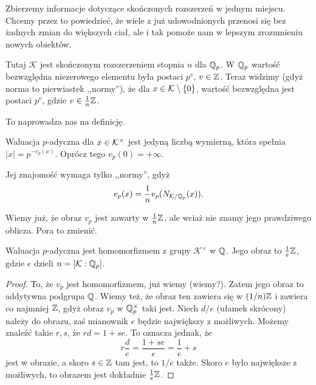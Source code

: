 Zbierzemy informacje dotyczące skończonych rozszerzeń w jednym miejscu.
Chcemy przez to powiedzieć, że wiele z już udowodnionych przenosi się bez żadnych zmian do większych ciał, ale i tak pomoże nam w lepszym zrozumieniu nowych obiektów.

Tutaj  $\mathcal K$ jest skończonym rozszerzeniem stopnia $n$ dla $\mathbb Q_p$.
W $\mathbb Q_p$ wartość bezwzględna niezerowego elementu była postaci $p^v$, $v \in \mathbb Z$.
Teraz widzimy (gdyż norma to pierwiastek ,,normy''), że dla $x \in \mathcal K \setminus \{0\}$, wartość bezwzględna jest postaci $p^v$, gdzie $v \in \frac 1 n \mathbb Z$.

To naprowadza nas na definicję.

\begin{definicja}
	Waluacja $p$-adyczna dla $x \in \mathcal K^\times$ jest jedyną liczbą wymierną, która spełnia $|x| = p^{-v_p(x)}$.
	Oprócz tego $v_p(0) = + \infty$. %
\end{definicja}

Jej znajomość wymaga tylko ,,normy'', gdyż 
\[
	v_p(x) = \frac 1 n v_p(N_{\mathcal K/\mathbb Q_p}(x)).
\]

Wiemy już, że obraz $v_p$ jest zawarty w $\frac 1 n \mathbb Z$, ale wciaż nie znamy jego prawdziwego oblicza.
Pora to zmienić.

\begin{fakt}
	Waluacja $p$-adyczna jest homomorfizmem z grupy $\mathcal K ^\times$ w $\mathbb Q$.
	Jego obraz to $\frac 1 e \mathbb Z$, gdzie $e$ dzieli $n = [\mathcal K : \mathbb Q_p]$.
\end{fakt}

\begin{proof}
	To, że $v_p$ jest homomorfizmem, już wiemy (wiemy?).
	Zatem jego obraz to addytywna podgrupa $\mathbb Q$.
	Wiemy też, że obraz ten zawiera się w $(1/n) \mathbb Z$ i zawiera co najmniej $\mathbb Z$, gdyż obraz $v_p$ w $\mathbb Q_p^\times$ taki jest.
	Niech $d/e$ (ułamek skrócony) należy do obrazu, zaś mianownik $e$ będzie największy z możliwych.
	Możemy znaleźć takie $r, s$, że $rd = 1 + se$.
	To oznacza jednak, że
	\[
		r \frac d e = \frac{1+se} e = \frac 1 e + s
	\]
	jest w obrazie, a skoro $s \in \mathbb Z$ tam jest, to $1/e$ także.
	Skoro $e$ było największe z możliwych, to obrazem jest dokładnie $\frac 1 e \mathbb Z$.
\end{proof}


